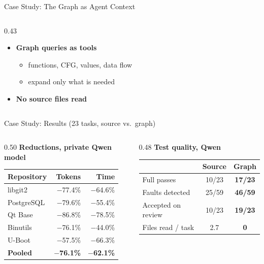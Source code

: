 \documentclass[aspectratio=169,10pt]{beamer}
\begin{document}
\begin{frame}{Case Study: The Graph as Agent Context}
\begin{columns}[c]
\begin{column}{0.43\textwidth}
\begin{itemize}
        \item \textbf{Graph queries as tools}
              \begin{itemize}
                \item functions, CFG, values, data flow
                \item expand only what is needed
              \end{itemize}
        \item \textbf{No source files read}
      \end{itemize}
    \end{column}
  \end{columns}
\end{frame}

\begin{frame}{Case Study: Results (23 tasks, source vs.\ graph)}
  \begin{columns}[T]
    \begin{column}{0.50\textwidth}
      \centering
      \textbf{Reductions, private Qwen model}\\[0.4em]
      \small
      \renewcommand{\arraystretch}{1.1}
      \begin{tabular}{l r r}
        \toprule
        Repository & Tokens & Time \\
        \midrule
        libgit2    & $-$77.4\% & $-$64.6\% \\
        PostgreSQL & $-$79.6\% & $-$55.4\% \\
        Qt Base    & $-$86.8\% & $-$78.5\% \\
        Binutils   & $-$76.1\% & $-$44.0\% \\
        U-Boot     & $-$57.5\% & $-$66.3\% \\
        \midrule
        \textbf{Pooled} & \textbf{$-$76.1\%} & \textbf{$-$62.1\%} \\
        \bottomrule
      \end{tabular}
    \end{column}
    \begin{column}{0.48\textwidth}
      \centering
      \textbf{Test quality, Qwen}\\[0.4em]
      \small
      \renewcommand{\arraystretch}{1.1}
      \begin{tabular}{l c c}
        \toprule
        & Source & Graph \\
        \midrule
        Full passes        & 10/23 & \textbf{17/23} \\
        Faults detected    & 25/59 & \textbf{46/59} \\
        Accepted on review & 10/23 & \textbf{19/23} \\
        Files read / task  & 2.7   & \textbf{0} \\
        \bottomrule
      \end{tabular}
    \end{column}
  \end{columns}


\end{frame}
\end{document}
